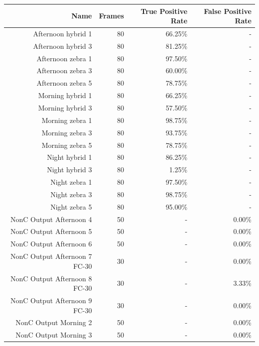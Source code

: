 \documentclass[12pt]{ucthesis}
\begin{document}
\begin{center}
    \begin{longtable}{| r | r | r | r |}
    \hline
    Name & Frames & True Positive Rate & False Positive Rate \bigstrut\\
    \hline
    Afternoon hybrid 1 & 80 & 66.25\% & - \bigstrut\\
    \hline
    Afternoon hybrid 3 & 80 & 81.25\% & - \bigstrut\\
    \hline
    Afternoon zebra 1 & 80 & 97.50\% & - \bigstrut\\
    \hline
    Afternoon zebra 3 & 80 & 60.00\% & - \bigstrut\\
    \hline
    Afternoon zebra 5 & 80 & 78.75\% & - \bigstrut\\
    \hline
    Morning hybrid 1 & 80 & 66.25\% & - \bigstrut\\
    \hline
    Morning hybrid 3 & 80 & 57.50\% & - \bigstrut\\
    \hline
    Morning zebra 1 & 80 & 98.75\% & - \bigstrut\\
    \hline
    Morning zebra 3 & 80 & 93.75\% & - \bigstrut\\
    \hline
    Morning zebra 5 & 80 & 78.75\% & - \bigstrut\\
    \hline
    Night hybrid 1 & 80 & 86.25\% & - \bigstrut\\
    \hline
    Night hybrid 3 & 80 & 1.25\% & - \bigstrut\\
    \hline
    Night zebra 1 & 80 & 97.50\% & - \bigstrut\\
    \hline
    Night zebra 3 & 80 & 98.75\% & - \bigstrut\\
    \hline
    Night zebra 5 & 80 & 95.00\% & - \bigstrut\\
    \hline
    NonC Output Afternoon 4 & 50 & -  & 0.00\% \bigstrut\\
    \hline
    NonC Output Afternoon 5 & 50 & -  & 0.00\% \bigstrut\\
    \hline
    NonC Output Afternoon 6 & 50 & -  & 0.00\% \bigstrut\\
    \hline
    NonC Output Afternoon 7 FC-30 & 30 & -  & 0.00\% \bigstrut\\
    \hline
    NonC Output Afternoon 8 FC-30 & 30 & -  & 3.33\% \bigstrut\\
    \hline
    NonC Output Afternoon 9 FC-30 & 30 & -  & 0.00\% \bigstrut\\
    \hline
    NonC Output Morning 2 & 50 & -  & 0.00\% \bigstrut\\
    \hline
    NonC Output Morning 3 & 50 & -  & 0.00\% \bigstrut\\

\end{longtable}
\end{center}
\end{document}
